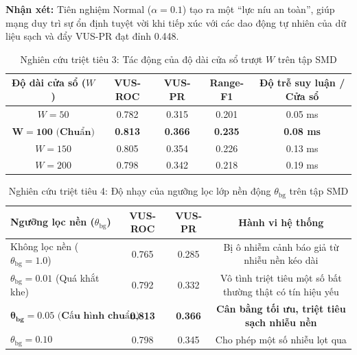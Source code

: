 \documentclass[11pt,journal,onecolumn]{IEEEtran}
\begin{document}
\textbf{Nhận xét:} Tiên nghiệm Normal ($\alpha = 0.1$) tạo ra một ``lực níu an toàn'', giúp mạng duy trì sự ổn định tuyệt vời khi tiếp xúc với các dao động tự nhiên của dữ liệu sạch và đẩy VUS-PR đạt đỉnh 0.448.

\begin{table}[htbp]
\centering
\caption{Nghiên cứu triệt tiêu 3: Tác động của độ dài cửa sổ trượt $W$ trên tập SMD}
\label{tab:ablation_window}
\begin{tabular}{ccccc}
\toprule
\textbf{Độ dài cửa sổ ($W$)} & \textbf{VUS-ROC} & \textbf{VUS-PR} & \textbf{Range-F1} & \textbf{Độ trễ suy luận / Cửa sổ} \\
\midrule
$W = 50$ & 0.782 & 0.315 & 0.201 & 0.05 ms \\
$\mathbf{W = 100 \text{ (Chuẩn)}}$ & \textbf{0.813} & \textbf{0.366} & \textbf{0.235} & \textbf{0.08 ms} \\
$W = 150$ & 0.805 & 0.354 & 0.226 & 0.13 ms \\
$W = 200$ & 0.798 & 0.342 & 0.218 & 0.19 ms \\
\bottomrule
\end{tabular}
\end{table}

\begin{table}[htbp]
\centering
\caption{Nghiên cứu triệt tiêu 4: Độ nhạy của ngưỡng lọc lớp nền động $\theta_{\text{bg}}$ trên tập SMD}
\label{tab:ablation_bg}
\begin{tabular}{lccc}
\toprule
\textbf{Ngưỡng lọc nền ($\theta_{\text{bg}}$)} & \textbf{VUS-ROC} & \textbf{VUS-PR} & \textbf{Hành vi hệ thống} \\
\midrule
Không lọc nền ($\theta_{\text{bg}} = 1.0$) & 0.765 & 0.285 & Bị ô nhiễm cảnh báo giả từ nhiễu nền kéo dài \\
$\theta_{\text{bg}} = 0.01$ (Quá khắt khe) & 0.792 & 0.332 & Vô tình triệt tiêu một số bất thường thật có tín hiệu yếu \\
$\mathbf{\theta_{\text{bg}} = 0.05 \text{ (Cấu hình chuẩn)}}$ & \textbf{0.813} & \textbf{0.366} & \textbf{Cân bằng tối ưu, triệt tiêu sạch nhiễu nền} \\
$\theta_{\text{bg}} = 0.10$ & 0.798 & 0.345 & Cho phép một số nhiễu lọt qua \\
\bottomrule
\end{tabular}
\end{table}
\end{document}
